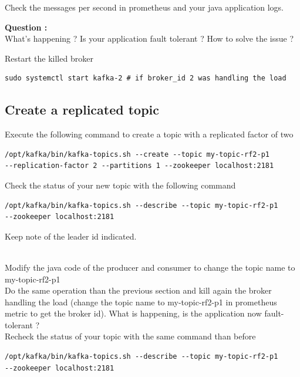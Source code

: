 \documentclass{article}
\newcounter{question}
\newenvironment{question}
    { \begin{mdframed}[backgroundcolor=gray!20] \textbf{Question \arabic{question} : } \stepcounter{question} \\}
    {  \end{mdframed}}
\newenvironment{code}
    { \begin{mdframed} }    {  \end{mdframed}}
\begin{document}
Check the messages per second in prometheus and your java application logs.

\begin{question}
 What's happening ? Is your application fault tolerant ? How to solve the issue ? 
\end{question}


Restart the killed broker 
\begin{code}
    \begin{verbatim}
sudo systemctl start kafka-2 # if broker_id 2 was handling the load \end{verbatim}
\end{code}
\subsection{Create a replicated topic}
Execute the following command to create a topic with a replicated factor of two

\begin{code}
    \begin{verbatim}
/opt/kafka/bin/kafka-topics.sh --create --topic my-topic-rf2-p1 
--replication-factor 2 --partitions 1 --zookeeper localhost:2181 \end{verbatim}
\end{code}


Check the status of your new topic with the following command
\begin{code}
    \begin{verbatim}
/opt/kafka/bin/kafka-topics.sh --describe --topic my-topic-rf2-p1 
--zookeeper localhost:2181 \end{verbatim}
\end{code}

Keep note of the leader id indicated.


\\
Modify the java code of the producer and consumer to change the topic name to my-topic-rf2-p1
\\


Do the same operation than the previous section and kill again the broker handling the load (change the topic name to my-topic-rf2-p1 in prometheus metric to get the broker id). What is happening, is the application now fault-tolerant ? 
\\


Recheck the status of your topic with the same command than before 
\begin{code}
    \begin{verbatim}
/opt/kafka/bin/kafka-topics.sh --describe --topic my-topic-rf2-p1 
--zookeeper localhost:2181 \end{verbatim}
\end{code}
\end{document}
